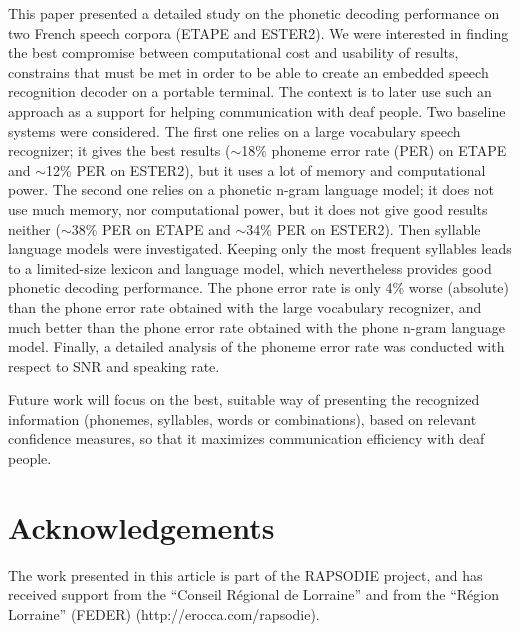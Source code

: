 \documentclass[runningheads,a4paper]{llncs}
\begin{document}
This paper presented a detailed study on the phonetic decoding performance
on two French speech corpora (ETAPE and ESTER2).
We were interested in finding the best compromise between computational
cost and usability of results, constrains that must be met in order
to be able to create an embedded speech recognition decoder on a portable
terminal. The context is to later use such an approach as a support
for helping communication with deaf people. Two baseline systems were
considered. The first one relies on a large vocabulary speech recognizer;
it gives the best results ($\sim$18\% phoneme error rate (PER) on
ETAPE and $\sim$12\% PER on ESTER2), but it uses a lot of memory
and computational power. The second one relies on a phonetic n-gram
language model; it does not use much memory, nor computational power,
but it does not give good results neither ($\sim$38\% PER on ETAPE
and $\sim$34\% PER on ESTER2). Then syllable language models were investigated. 
Keeping only the most frequent syllables leads to a limited-size lexicon and language
model, which nevertheless provides good phonetic decoding performance.
The phone error rate is only 4\% worse (absolute) than the phone error
rate obtained with the large vocabulary recognizer, and much better
than the phone error rate obtained with the phone n-gram language
model. Finally, a detailed analysis of the phoneme error rate was 
conducted with respect to SNR and speaking rate.

Future work will focus on the best, suitable way of presenting the
recognized information (phonemes, syllables, words or combinations),
based on relevant confidence measures, so that it maximizes communication
efficiency with deaf people.

\section{Acknowledgements}

The work presented in this article is part of the RAPSODIE project, and has received support from the “Conseil Régional de Lorraine” and from the “Région Lorraine” (FEDER) (http://erocca.com/rapsodie).
\end{document}
